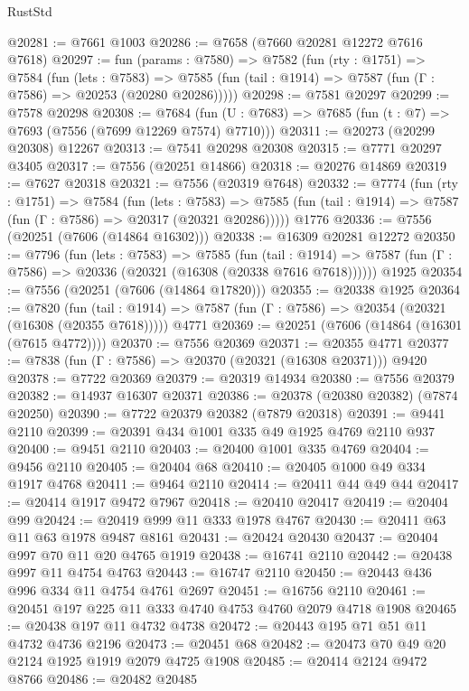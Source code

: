 \begin{lexlean}{RustStd}
\begin{coremodule}
{\begin{coremodule}
{{{{{{{{{{{{{{{{{{{{{{{{{{{{{{{{{{{{{{{{{{{@20281 := @7661 @1003
@20286 := @7658 (@7660 @20281 @12272 @7616 @7618)
@20297 := fun (params : @7580) =>
  @7582
    (fun (rty : @1751) =>
    @7584
      (fun (lets : @7583) =>
      @7585 (fun (tail : @1914) => @7587 (fun (Γ : @7586) => @20253 (@20280 @20286)))))
@20298 := @7581 @20297
@20299 := @7578 @20298
@20308 := @7684
    (fun (U : @7683) => @7685 (fun (t : @7) => @7693 (@7556 (@7699 @12269 @7574) @7710)))
@20311 := @20273 (@20299 @20308) @12267
@20313 := @7541 @20298 @20308
@20315 := @7771 @20297 @3405
@20317 := @7556 (@20251 @14866)
@20318 := @20276 @14869
@20319 := @7627 @20318
@20321 := @7556 (@20319 @7648)
@20332 := @7774
    (fun (rty : @1751) =>
    @7584
      (fun (lets : @7583) =>
      @7585 (fun (tail : @1914) => @7587 (fun (Γ : @7586) => @20317 (@20321 @20286)))))
    @1776
@20336 := @7556 (@20251 (@7606 (@14864 @16302)))
@20338 := @16309 @20281 @12272
@20350 := @7796
    (fun (lets : @7583) =>
    @7585
      (fun (tail : @1914) =>
      @7587 (fun (Γ : @7586) => @20336 (@20321 (@16308 (@20338 @7616 @7618))))))
    @1925
@20354 := @7556 (@20251 (@7606 (@14864 @17820)))
@20355 := @20338 @1925
@20364 := @7820
    (fun (tail : @1914) => @7587 (fun (Γ : @7586) => @20354 (@20321 (@16308 (@20355 @7618)))))
    @4771
@20369 := @20251 (@7606 (@14864 (@16301 (@7615 @4772))))
@20370 := @7556 @20369
@20371 := @20355 @4771
@20377 := @7838 (fun (Γ : @7586) => @20370 (@20321 (@16308 @20371))) @9420
@20378 := @7722 @20369
@20379 := @20319 @14934
@20380 := @7556 @20379
@20382 := @14937 @16307 @20371
@20386 := @20378 (@20380 @20382) (@7874 @20250)
@20390 := @7722 @20379 @20382 (@7879 @20318)
@20391 := @9441 @2110
@20399 := @20391 @434 @1001 @335 @49 @1925 @4769 @2110 @937
@20400 := @9451 @2110
@20403 := @20400 @1001 @335 @4769
@20404 := @9456 @2110
@20405 := @20404 @68
@20410 := @20405 @1000 @49 @334 @1917 @4768
@20411 := @9464 @2110
@20414 := @20411 @44 @49 @44
@20417 := @20414 @1917 @9472 @7967
@20418 := @20410 @20417
@20419 := @20404 @99
@20424 := @20419 @999 @11 @333 @1978 @4767
@20430 := @20411 @63 @11 @63 @1978 @9487 @8161
@20431 := @20424 @20430
@20437 := @20404 @997 @70 @11 @20 @4765 @1919
@20438 := @16741 @2110
@20442 := @20438 @997 @11 @4754 @4763
@20443 := @16747 @2110
@20450 := @20443 @436 @996 @334 @11 @4754 @4761 @2697
@20451 := @16756 @2110
@20461 := @20451 @197 @225 @11 @333 @4740 @4753 @4760 @2079 @4718 @1908
@20465 := @20438 @197 @11 @4732 @4738
@20472 := @20443 @195 @71 @51 @11 @4732 @4736 @2196
@20473 := @20451 @68
@20482 := @20473 @70 @49 @20 @2124 @1925 @1919 @2079 @4725 @1908
@20485 := @20414 @2124 @9472 @8766
@20486 := @20482 @20485
}}}}}}}}}}}}}}}}}}}}}}}}}}}}}}}}}}}}}}}}}}}
\end{coremodule}}
\end{coremodule}
\end{lexlean}
